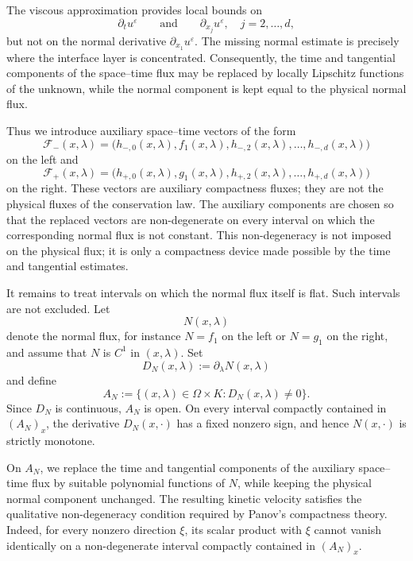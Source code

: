 \documentclass[11pt]{amsart}
\numberwithin{equation}{section}
\theoremstyle{plain}
\theoremstyle{definition}
\theoremstyle{remark}
\begin{document}
The viscous approximation provides local bounds on
\[
    \partial_t u^\varepsilon
    \qquad\text{and}\qquad
    \partial_{x_j}u^\varepsilon,\quad j=2,\ldots,d,
\]
but not on the normal derivative \(\partial_{x_1}u^\varepsilon\). The missing
normal estimate is precisely where the interface layer is concentrated.
Consequently, the time and tangential components of the space--time flux may
be replaced by locally Lipschitz functions of the unknown, while the normal
component is kept equal to the physical normal flux.

Thus we introduce auxiliary space--time vectors of the form
\[
    \mathcal F_-(x,\lambda)
    =
    \bigl(
        h_{-,0}(x,\lambda),
        f_1(x,\lambda),
        h_{-,2}(x,\lambda),
        \ldots,
        h_{-,d}(x,\lambda)
    \bigr)
\]
on the left and
\[
    \mathcal F_+(x,\lambda)
    =
    \bigl(
        h_{+,0}(x,\lambda),
        g_1(x,\lambda),
        h_{+,2}(x,\lambda),
        \ldots,
        h_{+,d}(x,\lambda)
    \bigr)
\]
on the right. These vectors are auxiliary compactness fluxes; they are not the
physical fluxes of the conservation law. The auxiliary components are chosen so
that the replaced vectors are non-degenerate on every interval on which the
corresponding normal flux is not constant. This non-degeneracy is not imposed
on the physical flux; it is only a compactness device made possible by the time
and tangential estimates.

It remains to treat intervals on which the normal flux itself is flat.  Such
intervals are not excluded.  Let
\[
    N(x,\lambda)
\]
denote the normal flux, for instance \(N=f_1\) on the left or \(N=g_1\) on
the right, and assume that \(N\) is \(C^1\) in \((x,\lambda)\).  Set
\[
    D_N(x,\lambda):=\partial_\lambda N(x,\lambda)
\]
and define
\begin{equation}
\label{eq:intro-nonflat-region}
    A_N
    :=
    \bigl\{
        (x,\lambda)\in\Omega\times K:
        D_N(x,\lambda)\neq0
    \bigr\}.
\end{equation}
Since \(D_N\) is continuous, \(A_N\) is open.  On every interval compactly
contained in \((A_N)_x\), the derivative \(D_N(x,\cdot)\) has a fixed
nonzero sign, and hence \(N(x,\cdot)\) is strictly monotone.

On \(A_N\), we replace the time and tangential components of the auxiliary
space--time flux by suitable polynomial functions of \(N\), while keeping
the physical normal component unchanged.  The resulting kinetic velocity
satisfies the qualitative non-degeneracy condition required by Panov's
compactness theory.  Indeed, for every nonzero direction \(\xi\), its scalar
product with \(\xi\) cannot vanish identically on a non-degenerate interval
compactly contained in \((A_N)_x\).
\end{document}
